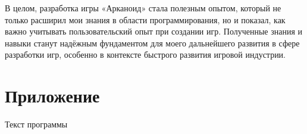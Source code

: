 \documentclass[14pt, oneside]{altsu-report}
\begin{document}
В целом, разработка игры «Арканоид» стала полезным опытом, который не только расширил мои знания в области программирования, но и показал, как важно учитывать пользовательский опыт при создании игр. Полученные знания и навыки станут надёжным фундаментом для моего дальнейшего развития в сфере разработки игр, особенно в контексте быстрого развития игровой индустрии.


\newpage
{}
\printbibliography[title={Список использованной литературы}]

\appendix
\newpage
\chapter*{\raggedleft\label{appendix1}Приложение}

\begin{center}
\label{code:appendix}Текст программы
\end{center}

\begin{code}
\vspace{-1cm}\inputminted{py}{src/arcanoid.py}
\end{code}
\end{document}
